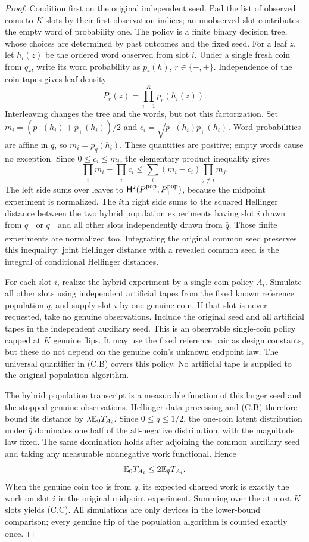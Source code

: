 \begin{proof}
Condition first on the original independent seed. Pad the list of observed
coins to $K$ slots by their first-observation indices; an unobserved slot
contributes the empty word of probability one. The policy is a finite binary
decision tree, whose choices are determined by past outcomes and the fixed
seed. For a leaf $z$, let $h_i(z)$ be the ordered word observed from slot $i$.
Under a single fresh coin from $q_r$, write its word probability as
$p_r(h)$, $r\in\{-,+\}$. Independence of the coin tapes gives leaf density
\[
 P_r(z)=\prod_{i=1}^Kp_r(h_i(z)).
\]
Interleaving changes the tree and the words, but not this factorization.
Set $m_i=(p_-(h_i)+p_+(h_i))/2$ and
$c_i=\sqrt{p_-(h_i)p_+(h_i)}$. Word probabilities are affine in $q$, so
$m_i=p_{\bar q}(h_i)$. These quantities are positive; empty words cause
no exception. Since $0\le c_i\le m_i$, the elementary product inequality
gives
\[
 \prod_i m_i-\prod_i c_i
   \le\sum_i(m_i-c_i)\prod_{j\ne i}m_j.                \tag{C.D}
\]
The left side sums over leaves to $\mathsf H^2(P_-^{\rm pop},P_+^{\rm pop})$,
because the midpoint experiment is normalized. The $i$th right side sums
to the squared Hellinger distance between the two hybrid population
experiments having slot $i$ drawn from $q_-$ or $q_+$ and all other slots
independently drawn from $\bar q$. Those finite experiments are normalized
too. Integrating the original common seed preserves this inequality: joint
Hellinger distance with a revealed common seed is the integral of conditional
Hellinger distances.

For each slot $i$, realize the hybrid experiment by a single-coin policy $A_i$.
Simulate all other slots using independent artificial tapes from the fixed
known reference population $\bar q$, and supply slot $i$ by one genuine
coin. If that slot is never requested, take no genuine observations. Include
the original seed and all artificial tapes in the independent auxiliary seed.
This is an observable single-coin policy capped at $K$ genuine flips.
It may use the fixed reference pair as design constants, but these do not
depend on the genuine coin's unknown endpoint law. The universal quantifier
in (C.B) covers this policy. No artificial tape is supplied to the original
population algorithm.

The hybrid population transcript is a measurable function of this larger
seed and the stopped genuine observations. Hellinger data processing and
(C.B) therefore bound its distance by $\lambda\mathbb E_0T_{A_i}$.
Since $0\le\bar q\le1/2$, the one-coin latent distribution under $\bar q$
dominates one half of the all-negative distribution, with the magnitude
law fixed. The same domination holds after adjoining the common auxiliary
seed and taking any measurable nonnegative work functional. Hence
\[
 \mathbb E_0 T_{A_i}\le2\mathbb E_{\bar q}T_{A_i}.
\]
When the genuine coin too is from $\bar q$, its expected charged work is
exactly the work on slot $i$ in the original midpoint experiment. Summing
over the at most $K$ slots yields (C.C). All simulations are only devices in
the lower-bound comparison; every genuine flip of the population algorithm
is counted exactly once.
\end{proof}

